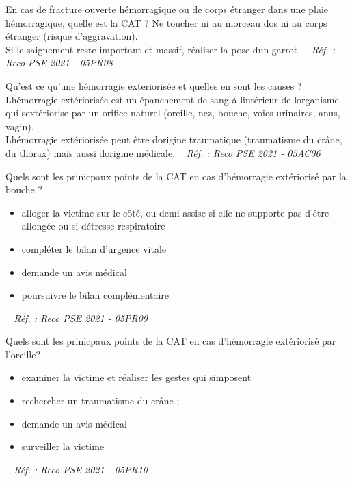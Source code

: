 \documentclass[grid,avery5371,landscape]{flashcards}
\makeatletter
\newcounter{nocarte}
\newcommand{\categ}[1]{%
  \def\@categ{#1}%
  \setcounter{nocarte}{0}%
}
\newcommand{\source}[1]{%
  \medskip
  \itshape%
   ~ \hfill Réf. : #1}
\makeatother
\begin{document}
\color[HTML]{003273}
\categ{PSE}
\begin{flashcard}[CAT]{
 En cas de fracture ouverte hémorragique ou de corps étranger dans une plaie hémorragique, quelle est la CAT ?   }
  Ne toucher ni au morceau dos ni au corps étranger (risque d'aggravation). \\
Si le saignement reste important et massif, réaliser la pose dun garrot.
  \source{Reco PSE 2021 - 05PR08}
\end{flashcard}


\color[HTML]{003273}
\categ{PSE}
\begin{flashcard}[bilan]{
 Qu'est ce qu'une hémorragie exteriorisée et quelles en sont les causes ?   }
  Lhémorragie extériorisée est un épanchement de sang à lintérieur de lorganisme qui sextériorise par un orifice naturel (oreille, nez, bouche, voies urinaires, anus, vagin). \\
Lhémorragie extériorisée peut être dorigine traumatique (traumatisme du crâne, du thorax) mais aussi dorigine médicale.
  \source{Reco PSE 2021 - 05AC06}
\end{flashcard}


\color[HTML]{003273}
\categ{PSE}
\begin{flashcard}[CAT]{
 Quels sont les prinicpaux points de la CAT en cas d'hémorragie extériorisé par la bouche ?   }
  \begin{itemize}
\item alloger la victime sur le côté, ou demi-assise si elle ne supporte pas d'être allongée ou si détresse respiratoire 
\item compléter le bilan d'urgence vitale
\item demande un avis médical
\item poursuivre le bilan complémentaire
\end{itemize}
  \source{Reco PSE 2021 - 05PR09}
\end{flashcard}


\color[HTML]{003273}
\categ{PSE}
\begin{flashcard}[CAT]{
 Quels sont les prinicpaux points de la CAT en cas d'hémorragie extériorisé par l'oreille?   }
  \begin{itemize}
\item examiner la victime et réaliser les gestes qui simposent
\item rechercher un traumatisme du crâne ;
\item demande un avis médical
\item surveiller la victime
\end{itemize}
  \source{Reco PSE 2021 - 05PR10}
\end{flashcard}
\end{document}
